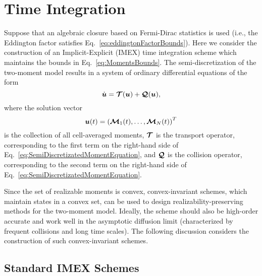\clearpage
\section{Time Integration} \label{se:TimeIntegration}

Suppose that an algebraic closure based on Fermi-Dirac statistics is used (i.e., the Eddington factor satisfies Eq.~\eqref{eq:eddingtonFactorBounds}).
Here we consider the construction of an Implicit-Explicit (IMEX) time integration scheme which maintains the bounds in Eq.~\eqref{eq:MomentsBounds}.  
The semi-discretization of the two-moment model results in a system of ordinary differential equations of the form
\begin{equation}
  \dot{\boldsymbol{u}} = \boldsymbol{\mathcal{T}}(\boldsymbol{u}) + \boldsymbol{\mathcal{Q}}(\boldsymbol{u}),
\end{equation}
where the solution vector
\begin{equation}
  \boldsymbol{u}(t) = \left( \boldsymbol{\mathcal{M}}_{1}(t),\ldots,\boldsymbol{\mathcal{M}}_{N}(t)\right) ^{T}
\end{equation}
is the collection of all cell-averaged moments, $\boldsymbol{\mathcal{T}}$ is the transport operator, corresponding to the first term on the right-hand side of Eq.~\eqref{eq:SemiDiscretizatedMomentEquation}, and $\boldsymbol{\mathcal{Q}}$ is the collision operator, corresponding to the second term on the right-hand side of Eq.~\eqref{eq:SemiDiscretizatedMomentEquation}.  

Since the set of realizable moments is convex, convex-invariant schemes, which maintain states in a convex set, can be used to design realizability-preserving methods for the two-moment model. 
Ideally, the scheme should also be high-order accurate and work well in the asymptotic diffusion limit (characterized by frequent collisions and long time scales).  
The following discussion considers the construction of such convex-invariant schemes.  

\subsection{Standard IMEX Schemes}

